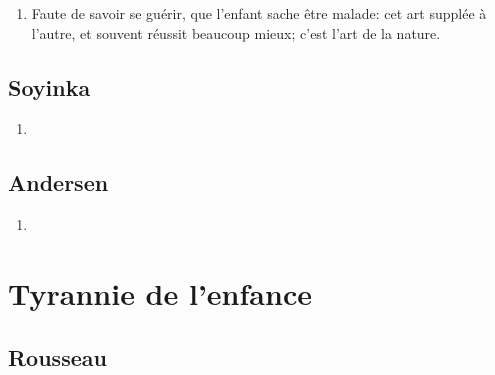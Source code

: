 \documentclass[a4paper, 11pt, hidelinks]{article}
\newcommand{\rb}[1]{\Romanbar{#1}}
\begin{document}
\begin{enumerate}
    \item Faute de savoir se guérir, que l'enfant sache être malade: cet art supplée à l'autre, et souvent réussit beaucoup mieux; c'est l'art de la nature. \rb{1}
\end{enumerate}



\subsection{Soyinka}


\begin{enumerate}
    \item 
\end{enumerate}




\subsection{Andersen}


\begin{enumerate}
    \item 
\end{enumerate}














































\section{Tyrannie de l'enfance}



\subsection{Rousseau}
\end{document}
